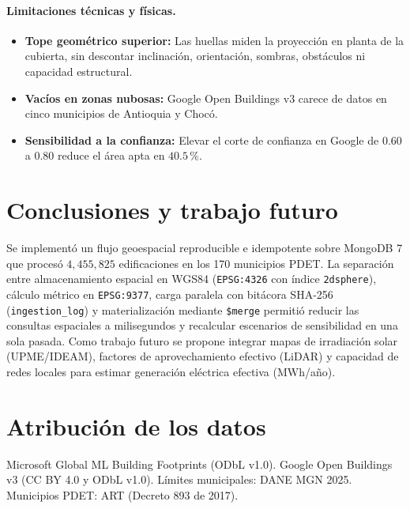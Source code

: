 \documentclass[12pt, letterpaper]{article}
\begin{document}
\paragraph{Limitaciones técnicas y físicas.}
\begin{itemize}
  \item \textbf{Tope geométrico superior:} Las huellas miden la proyección en planta de la cubierta, sin descontar inclinación, orientación, sombras, obstáculos ni capacidad estructural.
  \item \textbf{Vacíos en zonas nubosas:} Google Open Buildings v3 carece de datos en cinco municipios de Antioquia y Chocó.
  \item \textbf{Sensibilidad a la confianza:} Elevar el corte de confianza en Google de $0.60$ a $0.80$ reduce el área apta en $40.5\,\%$.
\end{itemize}

\section{Conclusiones y trabajo futuro}\label{sec:conclusiones}
Se implementó un flujo geoespacial reproducible e idempotente sobre MongoDB 7 que procesó $4{,}455{,}825$ edificaciones en los 170 municipios PDET. La separación entre almacenamiento espacial en WGS84 (\texttt{EPSG:4326} con índice \texttt{2dsphere}), cálculo métrico en \texttt{EPSG:9377}, carga paralela con bitácora SHA-256 (\texttt{ingestion\_log}) y materialización mediante \texttt{\$merge} permitió reducir las consultas espaciales a milisegundos y recalcular escenarios de sensibilidad en una sola pasada. Como trabajo futuro se propone integrar mapas de irradiación solar (UPME/IDEAM), factores de aprovechamiento efectivo (LiDAR) y capacidad de redes locales para estimar generación eléctrica efectiva ($\mathrm{MWh}$/año).

\section*{Atribución de los datos}
Microsoft Global ML Building Footprints (ODbL v1.0). Google Open Buildings v3 (CC BY 4.0 y ODbL v1.0). Límites municipales: DANE MGN 2025. Municipios PDET: ART (Decreto 893 de 2017).
\end{document}
